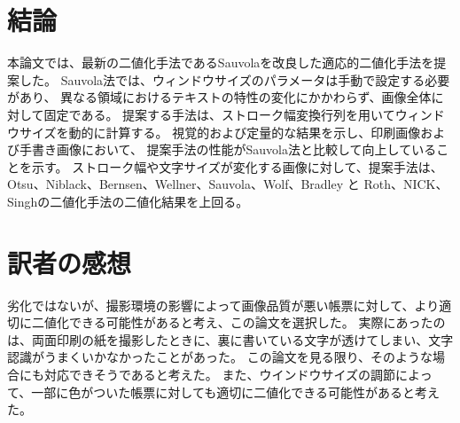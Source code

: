 \documentclass[uplatex, twocolumn,10pt]{jsarticle}
\begin{document}
\section{結論}

本論文では、最新の二値化手法であるSauvolaを改良した適応的二値化手法を提案した。
Sauvola法では、ウィンドウサイズのパラメータは手動で設定する必要があり、
異なる領域におけるテキストの特性の変化にかかわらず、画像全体に対して固定である。
提案する手法は、ストローク幅変換行列を用いてウィンドウサイズを動的に計算する。
視覚的および定量的な結果を示し、印刷画像および手書き画像において、
提案手法の性能がSauvola法と比較して向上していることを示す。
ストローク幅や文字サイズが変化する画像に対して、提案手法は、Otsu、Niblack、Bernsen、Wellner、Sauvola、Wolf、Bradley と Roth、NICK、Singhの二値化手法の二値化結果を上回る。


\section{訳者の感想}
劣化ではないが、撮影環境の影響によって画像品質が悪い帳票に対して、より適切に二値化できる可能性があると考え、この論文を選択した。
実際にあったのは、両面印刷の紙を撮影したときに、裏に書いている文字が透けてしまい、文字認識がうまくいかなかったことがあった。
この論文を見る限り、そのような場合にも対応できそうであると考えた。
また、ウインドウサイズの調節によって、一部に色がついた帳票に対しても適切に二値化できる可能性があると考えた。
\end{document}
